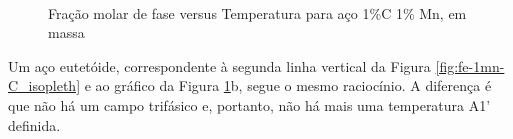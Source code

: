 \documentclass[brazil,tf,epusp]{usp}  %
\begin{document}
\begin{figure}[ht!]
  \hfill
  \\
  \caption{Fração molar de fase versus Temperatura para aço 1\%C 1\% Mn, em massa}
  \label{fig:fe-1mn-c}
\end{figure}

Um aço eutetóide, correspondente à segunda linha vertical da Figura \ref{fig:fe-1mn-C_isopleth} e ao gráfico da Figura \ref{fig:fe-1mn-c}b, segue o mesmo raciocínio. A diferença é que não há um campo trifásico e, portanto, não há mais uma temperatura A1' definida.
\end{document}
